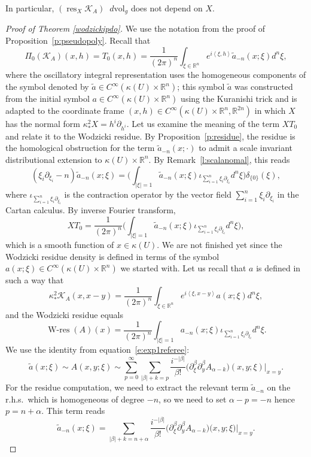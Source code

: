 \documentclass[JEP,XML,SOM,Unicode]{cedram}
\let\pazocal\mathscr
\theoremstyle{definition}
\newenvironment{refproof}[1]{\begin{proof}[Proof of {#1}]}{\end{proof}}
\let\cv\alpha
\let\asigma a
\let\euler X
\DeclareMathOperator{\wres}{{\scriptstyle W}-res}
\DeclareMathOperator{\resnorm}{res}
\newcommand{\resdyn}{{\resnorm_\euler}}
\newcommand\dvol{\mathop{}\!d\mathrm{vol}}
\begin{document}
In particular, $ (\resdyn {\pazocal{K}_{A}}) \dvol_g$ {does not depend} on $\euler$.

\begin{refproof}{Theorem \ref{wodzickipdo}}
We use the notation from the proof of Proposition~\ref{p:pseudopoly}.
Recall that
\[
\Pi_0({\pazocal{K}_{A}})(x,h)=T_0(x,h)=\frac{1}{(2\pi)^n} \int_{\xi\in \mathbb{R}^n} e^{i\left\langle \xi,h\right\rangle}\tilde{\asigma}_{-n}(x;\xi)d^n\xi,
\]
where the oscillatory integral representation uses the homogeneous components of the symbol denoted by $\tilde{\asigma} \in C^\infty(\kappa(U)\times \mathbb{R}^n)$; this
symbol $\tilde{\asigma}$ was constructed from the initial symbol $\asigma\in C^\infty(\kappa(U)\times \mathbb{R}^n)$ using the Kuranishi trick and
is adapted to the coordinate frame $(x,h)\in C^\infty(\kappa(U)\times \mathbb{R}^n, \mathbb{R}^{2n})$
in which $\euler$ has the normal form $\kappa^2_*\euler=h^i\partial_{h^i}$.
Let us examine the meaning of the term $\euler T_0$ and
relate it to the Wodzicki residue.
By Proposition~\ref{p:residue},
the residue is the homological obstruction for the term
$\tilde{\asigma}_{-n}(x;\cdot) $ to admit a scale invariant distributional extension to $\kappa(U)\times \mathbb{R}^n$.
By Remark~\ref{l:scalanomal},
this reads
\[
(\xi_i\partial_{\xi_i}-n) \tilde{\asigma}_{-n}(x;\xi)= \biggl(\int_{\vert \xi\vert=1}\tilde{\asigma}_{-n}(x;\xi) \iota_{\sum_{i=1}^n\xi_i\partial_{\xi_i}} d^n\xi \biggr)\delta_{\{0\}}(\xi),
\]
where $\iota_{\sum_{i=1}^n\xi_i\partial_{\xi_i}}$ is the contraction operator by the vector field $\sum_{i=1}^n\xi_i\partial_{\xi_i}$ in the Cartan calculus.
By inverse Fourier transform,
\[
\euler T_0=\frac{1}{(2\pi)^n} \biggl(\int_{\vert \xi\vert=1}\tilde{\asigma}_{-n}(x;\xi)\iota_{\sum_{i=1}^n\xi_i\partial_{\xi_i}} d^n\xi\biggr),
\]
which is a smooth function of $x\in \kappa(U)$.
We are not finished yet since the Wodzicki residue density is defined in terms of the
symbol $\asigma(x;\xi) \in C^\infty(\kappa(U)\times \mathbb{R}^n)$ we started with. Let us recall that $\asigma$ is defined in
such a way that
\[
\kappa^2_*{\pazocal{K}_A}(x,x-y)=\frac{1}{(2\pi)^n} \int_{\xi\in \mathbb{R}^n} e^{i\left\langle \xi,x-y\right\rangle}\asigma(x;\xi)d^n\xi,
\]
and the Wodzicki residue equals
\[
\wres(A)(x)=\frac{1}{(2\pi)^n} \int_{\vert \xi \vert=1}\asigma_{-n}(x;\xi) \iota_{\sum_{i=1}^n\xi_i\partial_{\xi_i}} d^n\xi.
\]
We use the identity from equation~\eqref{e:exp1referee}:
\[
\tilde{a}(x;\xi)\sim A(x,y;\xi)\sim \sum_{p=0}^\infty \sum_{\vert \beta\vert+k=p} \frac{i^{-\vert\beta\vert}}{\beta !} \bigl(\partial_\xi^\beta\partial_y^\beta A_{\alpha-k}\bigr)(x,y;\xi)|_{x=y}.
\]
For the residue computation, we need to extract the relevant term $\tilde{a}_{-n}$ on the r.h.s.~which is homogeneous of degree $-n$, so we need to set $\cv-p=-n$ hence $p=n+\cv $. This term reads
\[
\tilde{a}_{-n}(x;\xi)=\sum_{\vert \beta\vert+k=n+\cv} \frac{i^{-\vert\beta\vert}}{\beta !}\bigl(\partial_\xi^\beta\partial_y^\beta A_{\cv-k})(x,y;\xi\bigl)|_{x=y}.
\]


\end{refproof}
\end{document}

